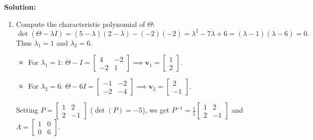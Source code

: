 \documentclass[11pt, letterpaper]{article}
\theoremstyle{definition}
\theoremstyle{remark}
\begin{document}
\textbf{Solution:}
\begin{enumerate}[label=(\alph*)]
    \item Compute the characteristic polynomial of $\Theta$:
    \[
    \det(\Theta - \lambda I) = (5 - \lambda)(2 - \lambda) - (-2)(-2) = \lambda^{2} - 7\lambda + 6 = (\lambda - 1)(\lambda - 6) = 0.
    \]
    Thus $\lambda_{1} = 1$ and $\lambda_{2} = 6$.
    \begin{itemize}
        \item For $\lambda_{1} = 1$: $\Theta - I = \begin{bmatrix} 4 & -2 \\ -2 & 1 \end{bmatrix} \implies \mathbf{v}_{1} = \begin{bmatrix} 1 \\ 2 \end{bmatrix}$.
        \item For $\lambda_{2} = 6$: $\Theta - 6I = \begin{bmatrix} -1 & -2 \\ -2 & -4 \end{bmatrix} \implies \mathbf{v}_{2} = \begin{bmatrix} 2 \\ -1 \end{bmatrix}$.
    \end{itemize}
    Setting $P = \begin{bmatrix} 1 & 2 \\ 2 & -1 \end{bmatrix}$ ($\det(P) = -5$), we get $P^{-1} = \frac{1}{5}\begin{bmatrix} 1 & 2 \\ 2 & -1 \end{bmatrix}$ and $\Lambda = \begin{bmatrix} 1 & 0 \\ 0 & 6 \end{bmatrix}$.


\end{enumerate}
\end{document}
